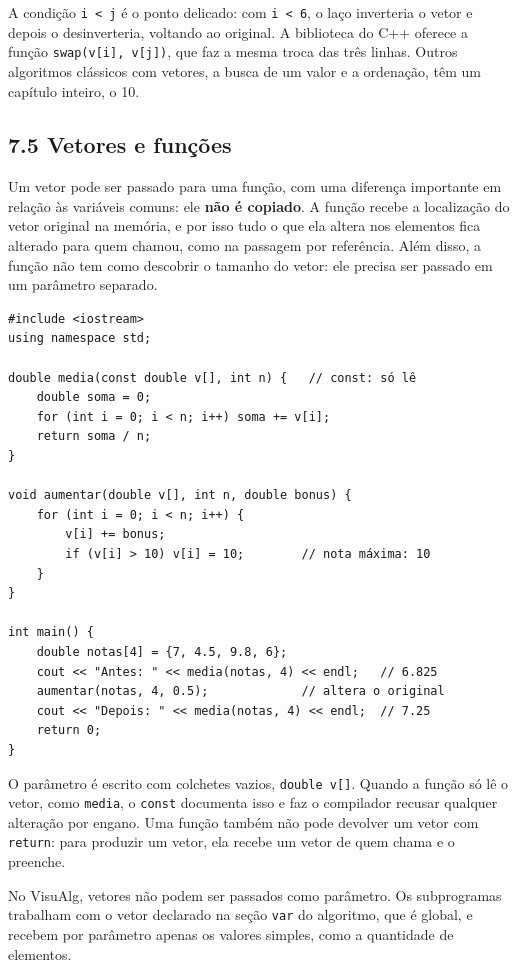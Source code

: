 A condição \texttt{i < j} é o ponto delicado: com \texttt{i < 6}, o laço inverteria o vetor e depois o desinverteria, voltando ao original. A biblioteca do C++ oferece a função \texttt{swap(v[i], v[j])}, que faz a mesma troca das três linhas. Outros algoritmos clássicos com vetores, a busca de um valor e a ordenação, têm um capítulo inteiro, o 10.

\subsection{7.5 Vetores e funções}

Um vetor pode ser passado para uma função, com uma diferença importante em relação às variáveis comuns: ele \textbf{não é copiado}. A função recebe a localização do vetor original na memória, e por isso tudo o que ela altera nos elementos fica alterado para quem chamou, como na passagem por referência. Além disso, a função não tem como descobrir o tamanho do vetor: ele precisa ser passado em um parâmetro separado.

\begin{codigo}
\begin{Verbatim}[breaklines=true, breaksymbolleft={}, fontsize=\footnotesize]
#include <iostream>
using namespace std;

double media(const double v[], int n) {   // const: só lê
    double soma = 0;
    for (int i = 0; i < n; i++) soma += v[i];
    return soma / n;
}

void aumentar(double v[], int n, double bonus) {
    for (int i = 0; i < n; i++) {
        v[i] += bonus;
        if (v[i] > 10) v[i] = 10;        // nota máxima: 10
    }
}

int main() {
    double notas[4] = {7, 4.5, 9.8, 6};
    cout << "Antes: " << media(notas, 4) << endl;   // 6.825
    aumentar(notas, 4, 0.5);             // altera o original
    cout << "Depois: " << media(notas, 4) << endl;  // 7.25
    return 0;
}
\end{Verbatim}
\end{codigo}

O parâmetro é escrito com colchetes vazios, \texttt{double v[]}. Quando a função só lê o vetor, como \texttt{media}, o \texttt{const} documenta isso e faz o compilador recusar qualquer alteração por engano. Uma função também não pode devolver um vetor com \texttt{return}: para produzir um vetor, ela recebe um vetor de quem chama e o preenche.

No VisuAlg, vetores não podem ser passados como parâmetro. Os subprogramas trabalham com o vetor declarado na seção \texttt{var} do algoritmo, que é global, e recebem por parâmetro apenas os valores simples, como a quantidade de elementos.

